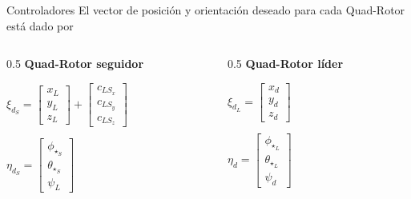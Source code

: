 \documentclass[hyperref={pdfpagelabels=false}]{beamer}
\begin{document}
\begin{frame}{Controladores}
	El vector de posición y orientación deseado para cada Quad-Rotor está dado por 
	\begin{columns}[T]
		\begin{column}{0.5\textwidth}
			\centering
			\textbf{Quad-Rotor seguidor}
			\vspace{1em}
			
			$\xi_{d_S} = \begin{bmatrix}x_L\\y_L\\z_L\end{bmatrix} + \begin{bmatrix}c_{LS_x}\\c_{LS_y}\\c_{LS_z}\end{bmatrix}$
			
			\vspace{1em}
			
			$\eta_{d_S} = \begin{bmatrix}\phi_{\star_S}\\\theta_{\star_S}\\\psi_L\end{bmatrix}$
		\end{column}
		
		\begin{column}{0.5\textwidth}
			\centering
			\textbf{Quad-Rotor líder}			
			\vspace{1em}
			
			$\xi_{d_L} = \begin{bmatrix}x_d\\y_d\\z_d\end{bmatrix}$
			
			\vspace{1em}
			
			$\eta_{d} = \begin{bmatrix}\phi_{\star_L}\\\theta_{\star_L}\\\psi_d\end{bmatrix}$
		\end{column}
	\end{columns}
\end{frame}
\end{document}
